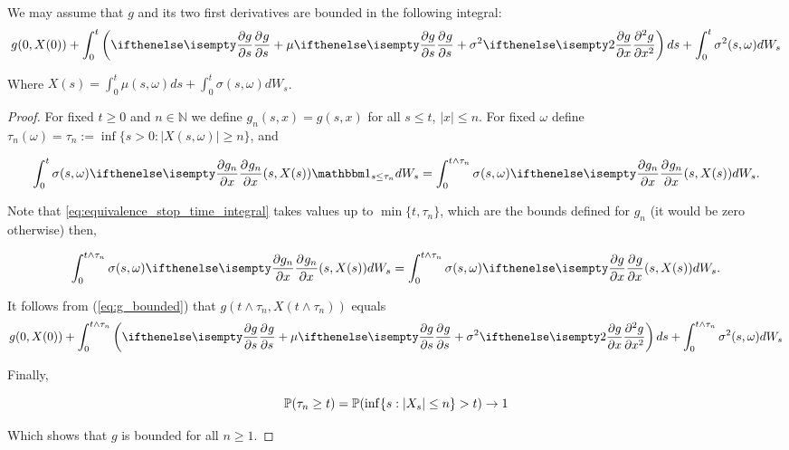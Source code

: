 \documentclass[../TGMAFFIRO.tex]{subfiles}
\begin{document}
\begin{proposition}\label{prop:on_bounded_ito_g}
We may assume that $g$ and its two first derivatives are bounded in the following integral:
\begin{equation}\label{eq:g_bounded}
  g(0, X(0)) + \int_0^t \left(\partialwrt{g}{s} + \mu\partialwrt{g}{s} + \sigma^2\partialwrt[2]{g}{x}\right) ds + \int_0^t\sigma^2(s, \omega) dW_s
\end{equation}

Where $X(s) = \int_0^t \mu(s, \omega) ds + \int_0^t \sigma(s, \omega) dW_s$.

\begin{proof}
	For fixed $t\geq 0$ and $n\in\mathbb{N}$ we define $g_n(s, x) = g(s, x)$ for all $s \leq t$, $|x|\leq n$. For fixed $\omega$ define $\tau_n(\omega) = \tau_n := \inf\{s>0: |X(s,\omega)| \geq n\}$, and
	
	\begin{equation}\label{eq:equivalence_stop_time_integral}
		\int_0^{t} \sigma(s,\omega) \partialwrt{g_n}{x}(s, X(s)) \ind_{s\leq \tau_n} dW_s = \int_0^{t\wedge\tau_n} \sigma(s,\omega) \partialwrt{g_n}{x} (s, X(s)) dW_s.
	\end{equation}

Note that \ref{eq:equivalence_stop_time_integral} takes values up to $\min\{t, \tau_n\}$, which are the bounds defined for $g_n$ (it would be zero otherwise) then,

	\begin{equation}
	  \int_0^{t\wedge\tau_n} \sigma(s,\omega) \partialwrt{g_n}{x} (s, X(s)) dW_s = \int_0^{t\wedge\tau_n} \sigma(s,\omega) \partialwrt{g}{x} (s, X(s)) dW_s.
	\end{equation}
	

It follows from (\ref{eq:g_bounded}) that $g(t\wedge\tau_n, X(t\wedge\tau_n))$ equals
\begin{equation}
  g(0, X(0)) + \int_0^{t\wedge\tau_n} \left(\partialwrt{g}{s} + \mu\partialwrt{g}{s} + \sigma^2\partialwrt[2]{g}{x}\right) ds + \int_0^{t\wedge\tau_n}\sigma^2(s, \omega) dW_s
\end{equation}

Finally,

\begin{equation}
  \mathbb{P}(\tau_n \geq t) = 	\mathbb{P}(\inf	\{s: |X_s| \leq n\} > t) \to 1
\end{equation}

Which shows that $g$ is bounded for all $n \geq 1$.
\end{proof}
\end{proposition}
\end{document}

